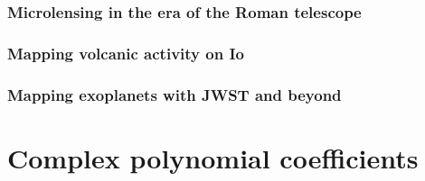 \documentclass[12pt,dvipsnames]{report}
\begin{document}
\subsection{Microlensing in the era of the Roman telescope}
\subsection{Mapping volcanic activity on Io}
\subsection{Mapping exoplanets with JWST and beyond}

\appendix

\chapter{Complex polynomial coefficients}
\label{app:complex_poly}
\end{document}
